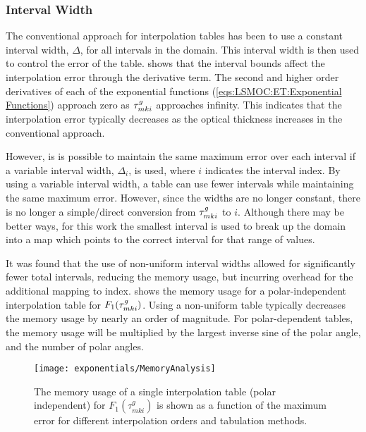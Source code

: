 {{{      \subsubsection{Interval Width}{\label{sssec:LSMOC:ET:Interval Width}
        The conventional approach for interpolation tables has been to use a constant interval width, $\Delta$, for all intervals in the domain.
        This interval width is then used to control the error of the table.
         shows that the interval bounds affect the interpolation error through the derivative term.
        The second and higher order derivatives of each of the exponential functions (\cref{eqs:LSMOC:ET:Exponential Functions}) approach zero as $\segopt$ approaches infinity.
        This indicates that the interpolation error typically decreases as the optical thickness increases in the conventional approach.

        However, is is possible to maintain the same maximum error over each interval if a variable interval width, $\Delta_i$, is used, where $i$ indicates the interval index.
        By using a variable interval width, a table can use fewer intervals while maintaining the same maximum error.
        However, since the widths are no longer constant, there is no longer a simple/direct conversion from $\segopt$ to $i$.
        Although there may be better ways, for this work the smallest interval is used to break up the domain into a map which points to the correct interval for that range of values.

        It was found that the use of non-uniform interval widths allowed for significantly fewer total intervals, reducing the memory usage, but incurring overhead for the additional mapping to index.
         shows the memory usage for a polar-independent interpolation table for $F_1(\segopt)$.
        Using a non-uniform table typically decreases the memory usage by nearly an order of magnitude.
        For polar-dependent tables, the memory usage will be multiplied by the largest inverse sine of the polar angle, and the number of polar angles.

        \begin{figure}
          \centering
          \texttt{[image: exponentials/MemoryAnalysis]}
          \caption{The memory usage of a single interpolation table (polar independent) for $F_1(\tau^g_{mki})$ is shown as a function of the maximum error for different interpolation orders and tabulation methods.\label{fig:LSMOC:ET:Memory Analysis}}
        \end{figure}

}}}}

